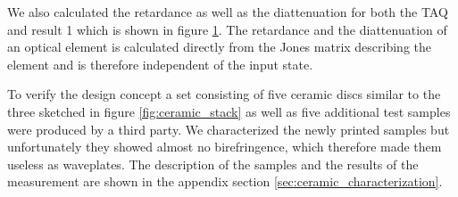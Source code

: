 We also calculated the retardance as well as the diattenuation for both the TAQ and result 1 which is shown in figure \ref{fig:cl4_ret_diat}. The retardance and the diattenuation of an optical element is calculated directly from the Jones matrix describing the element and is therefore independent of the input state. 

\begin{figure}[H]
    \centering
    
    \caption{}
    \label{fig:cl4_ret_diat}
\end{figure}



To verify the design concept a set consisting of five ceramic discs similar to the three sketched in figure \ref{fig:ceramic_stack} as well as five additional test samples were produced by a third party. We characterized the newly printed samples but unfortunately they showed almost no birefringence, which therefore made them useless as waveplates. The description of the samples and the results of the measurement are shown in the appendix section \ref{sec:ceramic_characterization}. 



